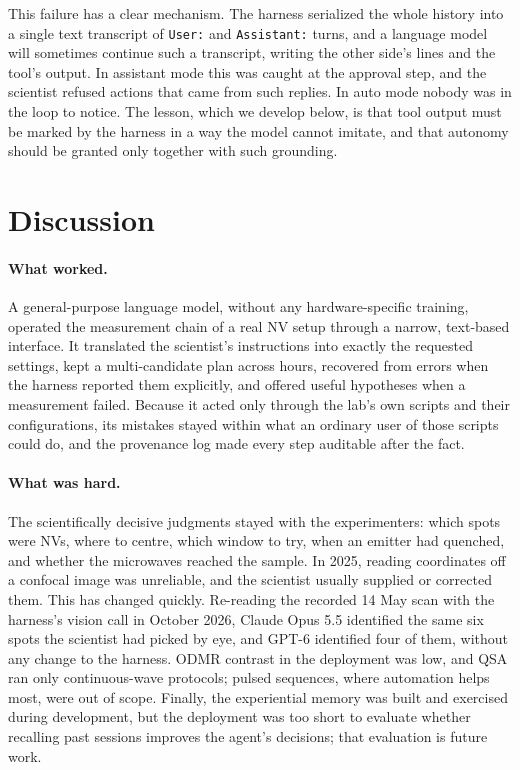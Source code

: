 \documentclass[10pt]{article}
\newcommand{\qsa}{QSA}
\newcommand{\code}[1]{\texttt{#1}}
\begin{document}
This failure has a clear mechanism.
The harness serialized the whole history into a single text transcript of \code{User:} and \code{Assistant:} turns, and a language model will sometimes continue such a transcript, writing the other side's lines and the tool's output.
In assistant mode this was caught at the approval step, and the scientist refused actions that came from such replies.
In auto mode nobody was in the loop to notice.
The lesson, which we develop below, is that tool output must be marked by the harness in a way the model cannot imitate, and that autonomy should be granted only together with such grounding.

\section{Discussion}
\label{sec:discussion}

\paragraph{What worked.}
A general-purpose language model, without any hardware-specific training, operated the measurement chain of a real NV setup through a narrow, text-based interface.
It translated the scientist's instructions into exactly the requested settings, kept a multi-candidate plan across hours, recovered from errors when the harness reported them explicitly, and offered useful hypotheses when a measurement failed.
Because it acted only through the lab's own scripts and their configurations, its mistakes stayed within what an ordinary user of those scripts could do, and the provenance log made every step auditable after the fact.

\paragraph{What was hard.}
The scientifically decisive judgments stayed with the experimenters: which spots were NVs, where to centre, which window to try, when an emitter had quenched, and whether the microwaves reached the sample.
In 2025, reading coordinates off a confocal image was unreliable, and the scientist usually supplied or corrected them.
This has changed quickly.
Re-reading the recorded 14 May scan with the harness's vision call in October 2026, Claude Opus 5.5 identified the same six spots the scientist had picked by eye, and GPT-6 identified four of them, without any change to the harness.
ODMR contrast in the deployment was low, and \qsa{} ran only continuous-wave protocols; pulsed sequences, where automation helps most, were out of scope.
Finally, the experiential memory was built and exercised during development, but the deployment was too short to evaluate whether recalling past sessions improves the agent's decisions; that evaluation is future work.
\end{document}
